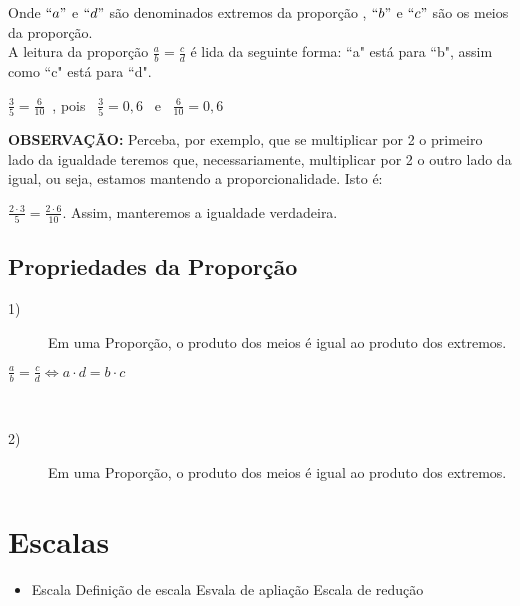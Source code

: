 \noindent Onde $``a"$ e $``d"$ são denominados extremos da proporção , $``b"$ e $``c"$ são os meios da proporção.\\
\noindent A leitura da proporção  $\frac{a}{b} = \frac{c}{d}$ é lida da seguinte forma: ``a" está para ``b", assim como ``c" está para ``d".

\begin{example}
    $\frac{3}{5}=\frac{6}{10}$~, pois~ $\frac{3}{5}=0,6$~ e ~$\frac{6}{10}=0,6$
\end{example}

\noindent \textbf{OBSERVAÇÃO:} Perceba, por exemplo, que se multiplicar por 2 o primeiro lado da igualdade teremos que, necessariamente, multiplicar por 2 o outro lado da igual, ou seja, estamos mantendo a proporcionalidade. Isto é:

\begin{example}
    $\frac{2 \cdot 3}{5}=\frac{2 \cdot 6}{10}$. Assim, manteremos a igualdade verdadeira. 
\end{example}

\subsection{Propriedades da Proporção}
    \begin{description}
    \item[1)] Em uma Proporção, o produto dos meios é igual ao produto dos extremos. \\
    \end{description}
 
 \begin{center}
    $\frac{a}{b} = \frac{c}{d} \Longleftrightarrow a\cdot d=b \cdot c$     
 \end{center}   

    \\
    \begin{description}
    \item[2)] Em uma Proporção, o produto dos meios é igual ao produto dos extremos. 
    \end{description}

\section{Escalas}

	\begin{itemize}
		\item Escala
		\subitem Definição de escala 
		\subitem Esvala de apliação
		\subitem Escala de redução
	\end{itemize}

